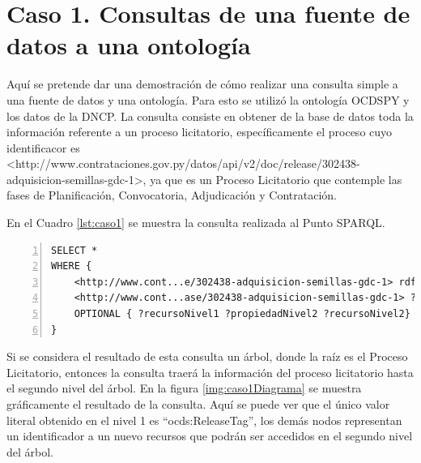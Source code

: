 \section{Caso 1. Consultas de una fuente de datos a una ontología}
\label{section:caso1}


Aquí se pretende dar una demostración de cómo realizar una consulta simple a una fuente de datos y una ontología. Para esto se utilizó la ontología OCDSPY y los datos de la DNCP. La consulta consiste en obtener de la base de datos toda la información referente a un proceso licitatorio, específicamente el proceso cuyo identificacor es <http://www.contrataciones.gov.py/datos/api/v2/doc/release/302438-adquisicion-semillas-gdc-1>, ya que es un Proceso Licitatorio que contemple las fases de Planificación, Convocatoria, Adjudicación y Contratación.

En el Cuadro \ref{lst:caso1} se muestra la consulta realizada al Punto SPARQL.

\noindent\begin{minipage}[t]{\textwidth}
\begin{lstlisting}[captionpos=b, caption={Triplas referentes al proceso licitatorio cuyo identificador es 302438}, label={lst:caso1},  numbers=left,  numberstyle=\tiny\color{mygray},frame=single]
SELECT *  
WHERE {    	
    <http://www.cont...e/302438-adquisicion-semillas-gdc-1> rdf:type ocds:Release .
    <http://www.cont...ase/302438-adquisicion-semillas-gdc-1> ?propiedadNivel1 ?recursoNivel1 .   
    OPTIONAL { ?recursoNivel1 ?propiedadNivel2 ?recursoNivel2}
}  
 \end{lstlisting}
\end{minipage}

 Si se considera el resultado de esta consulta un árbol, donde la raíz es el Proceso Licitatorio, entonces la consulta traerá la información del proceso licitatorio hasta el segundo nivel del árbol. En la figura \ref{img:caso1Diagrama} se muestra gráficamente el resultado de la consulta. Aquí se puede ver que el único valor literal obtenido en el nivel 1 es “ocds:ReleaseTag”, los demás nodos representan un identificador a un nuevo recursos que podrán ser accedidos en el segundo nivel del árbol.
 
